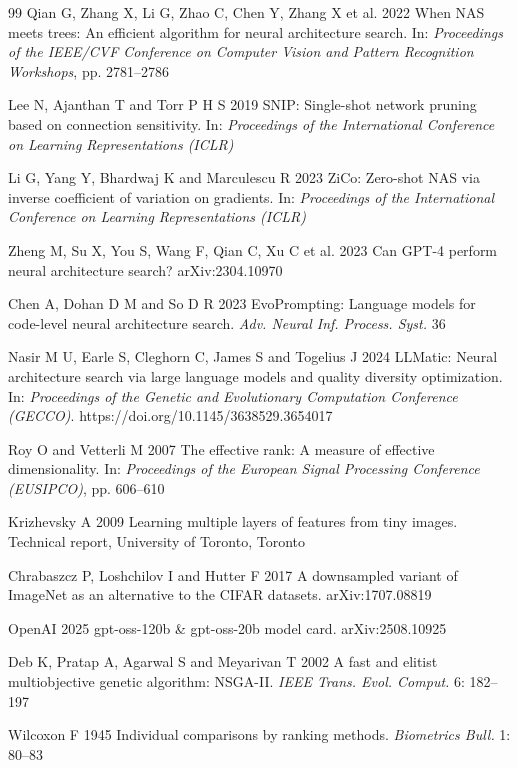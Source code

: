 \documentclass{sadhana}
\begin{document}
\begin{thebibliography}{99}
 Qian G, Zhang X, Li G, Zhao C, Chen Y, Zhang X et al. 2022 When NAS meets trees: An efficient algorithm for neural architecture search. In: \textit{Proceedings of the IEEE/CVF Conference on Computer Vision and Pattern Recognition Workshops}, pp. 2781--2786

 Lee N, Ajanthan T and Torr P H S 2019 SNIP: Single-shot network pruning based on connection sensitivity. In: \textit{Proceedings of the International Conference on Learning Representations (ICLR)}

 Li G, Yang Y, Bhardwaj K and Marculescu R 2023 ZiCo: Zero-shot NAS via inverse coefficient of variation on gradients. In: \textit{Proceedings of the International Conference on Learning Representations (ICLR)}

 Zheng M, Su X, You S, Wang F, Qian C, Xu C et al. 2023 Can GPT-4 perform neural architecture search? arXiv:2304.10970

 Chen A, Dohan D M and So D R 2023 EvoPrompting: Language models for code-level neural architecture search. \textit{Adv. Neural Inf. Process. Syst.} 36

 Nasir M U, Earle S, Cleghorn C, James S and Togelius J 2024 LLMatic: Neural architecture search via large language models and quality diversity optimization. In: \textit{Proceedings of the Genetic and Evolutionary Computation Conference (GECCO)}. https://doi.org/10.1145/3638529.3654017

 Roy O and Vetterli M 2007 The effective rank: A measure of effective dimensionality. In: \textit{Proceedings of the European Signal Processing Conference (EUSIPCO)}, pp. 606--610

 Krizhevsky A 2009 Learning multiple layers of features from tiny images. Technical report, University of Toronto, Toronto

 Chrabaszcz P, Loshchilov I and Hutter F 2017 A downsampled variant of ImageNet as an alternative to the CIFAR datasets. arXiv:1707.08819

 OpenAI 2025 gpt-oss-120b \& gpt-oss-20b model card. arXiv:2508.10925

 Deb K, Pratap A, Agarwal S and Meyarivan T 2002 A fast and elitist multiobjective genetic algorithm: NSGA-II. \textit{IEEE Trans. Evol. Comput.} 6: 182--197

 Wilcoxon F 1945 Individual comparisons by ranking methods. \textit{Biometrics Bull.} 1: 80--83


\end{thebibliography}
\end{document}
